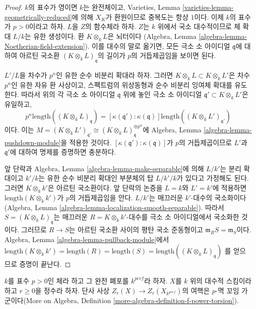 \begin{proof}
$k$의 표수가 영이면 $k$는 완전체이고, Varieties, Lemma
\ref{varieties-lemma-geometrically-reduced}에 의해 $X_K$가 환원이므로
중복도는 항상 $1$이다. 이제 $k$의 표수가 $p > 0$이라고 하자.
$L$을 $Z$의 함수체라 하자. $Z$는 $k$ 위에서 국소 대수적이므로
체 확대 $L/k$는 유한 생성이다. 환 $K \otimes_k L$은 뇌터이다
(Algebra, Lemma \ref{algebra-lemma-Noetherian-field-extension}).
이를 대수의 말로 옮기면, 모든 극소 소 아이디얼 $\mathfrak q$에
대하여 아르틴 국소환 $(K \otimes_k L)_\mathfrak q$의 길이가
$p$의 거듭제곱임을 보이면 된다.

\medskip\noindent
$L'/L$을 차수가 $p^n$인 유한 순수 비분리 확대라 하자. 그러면
$K \otimes_k L \subset K \otimes_k L'$은 차수 $p^n$인 유한 자유
환 사상이고, 스펙트럼의 위상동형과 순수 비분리 잉여체 확대를
유도한다. 따라서 위의 각 극소 소 아이디얼 $\mathfrak q$ 위에 놓인
극소 소 아이디얼 $\mathfrak q' \subset K \otimes_k L'$은 유일하고,
$$
p^n \text{length}((K \otimes_k L)_\mathfrak q) =
[\kappa(\mathfrak q') : \kappa(\mathfrak q)]
\text{length}((K \otimes_k L')_{\mathfrak q'})
$$
이다. 이는 $M = (K \otimes_k L')_{\mathfrak q'} \cong
(K \otimes_k L)_{\mathfrak q}^{\oplus p^n}$에 Algebra, Lemma
\ref{algebra-lemma-pushdown-module}을 적용한 것이다.
$[\kappa(\mathfrak q') : \kappa(\mathfrak q)]$가 $p$의 거듭제곱이므로
$L'$과 $\mathfrak q'$에 대하여 명제를 증명하면 충분하다.

\medskip\noindent
앞 단락과 Algebra, Lemma \ref{algebra-lemma-make-separable}에 의해
$L/k'$는 분리 확대이고 $k'/k$는 유한 순수 비분리 확대인 부분체의
탑 $L/k'/k$가 있다고 가정해도 된다. 그러면 $K \otimes_k k'$은
아르틴 국소환이다. 앞 단락의 논증을 $L = k$와 $L' = k'$에
적용하면 $\text{length}(K \otimes_k k')$가 $p$의 거듭제곱임을 안다.
$L/k'$는 매끄러운 $k'$-대수의 국소화이다
(Algebra, Lemma \ref{algebra-lemma-localization-smooth-separable}).
따라서 $S = (K \otimes_k L)_\mathfrak q$는 매끄러운
$R = K \otimes_k k'$-대수를 극소 소 아이디얼에서 국소화한 것이다.
그러므로 $R \to S$는 아르틴 국소환 사이의 평탄 국소 준동형이고
$\mathfrak m_R S = \mathfrak m_S$이다. Algebra, Lemma
\ref{algebra-lemma-pullback-module}에서
$\text{length}(K \otimes_k k') = \text{length}(R) =
\text{length}(S) = \text{length}((K \otimes_k L)_\mathfrak q)$
를 얻으므로 증명이 끝난다.
\end{proof}




\begin{lemma}
\label{lemma-how-different}
$k$를 표수 $p > 0$인 체라 하고 그 완전 폐포를 $k^{perf}$라 하자.
$X$를 $k$ 위의 대수적 스킴이라 하고 $r \geq 0$을 정수라 하자.
단사 사상 $Z_r(X) \to Z_r(X_{k^{perf}})$의 여핵은
$p$-멱 꼬임 가군이다(More on Algebra, Definition
\ref{more-algebra-definition-f-power-torsion}).
\end{lemma}

